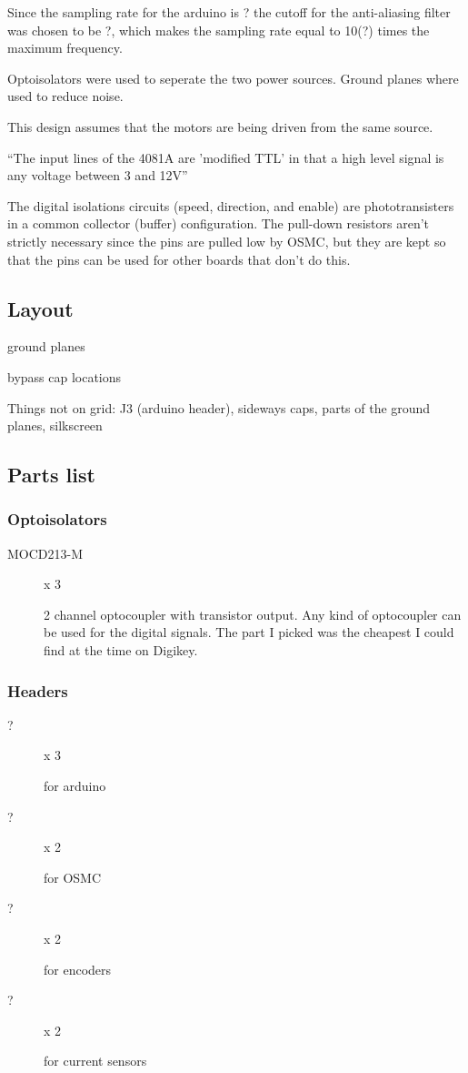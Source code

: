 \documentclass[letterpaper,12pt,notitlepage]{report}
\begin{document}
Since the sampling rate for the arduino is ? the cutoff for the anti-aliasing filter was chosen to be ?, which makes the sampling rate equal to 10(?) times the maximum frequency.

Optoisolators were used to seperate the two power sources.  Ground planes where used to reduce noise.

This design assumes that the motors are being driven from the same source.

\textquotedblleft The input lines of the 4081A are 'modified TTL' in that a high level signal is any voltage between 3 and 12V\textquotedblright

The digital isolations circuits (speed, direction, and enable) are phototransisters in a common collector (buffer) configuration.  The pull-down resistors aren't strictly necessary since the pins are pulled low by OSMC, but they are kept so that the pins can be used for other boards that don't do this.



\subsection{Layout}

ground planes

bypass cap locations

Things not on grid:  J3 (arduino header), sideways caps, parts of the ground planes, silkscreen

\subsection{Parts list}
\subsubsection{Optoisolators}
\begin{description}
 \item[MOCD213-M] x 3

2 channel optocoupler with transistor output.  Any kind of optocoupler can be used for the digital signals.  The part I picked was the cheapest I could find at the time on Digikey.

\end{description}

\subsubsection{Headers}
\begin{description}
 \item[?] x 3

for arduino

 \item[?] x 2

for OSMC

 \item[?] x 2

for encoders

 \item[?] x 2

for current sensors

 \end{description}
\end{document}
